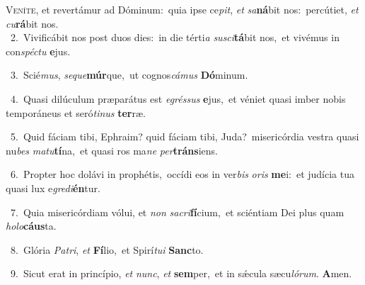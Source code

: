 \lettrine{\initial\textcolor{\initialcolor}{V}}{eníte,} et revertámur ad Dóminum:~\dagger quia ipse ce\-\textit{pit}\-, \textit{et} \textit{sa}\-\textbf{ná}bit nos:~\star percútiet, \textit{et} \textit{cu}\-\textbf{rá}bit nos.\\
{\numbfont\textcolor{\numbcolor}{~2.}}~Vivificábit nos post duos dies:~\dagger in die térti\textit{a} \textit{su}\-\textit{sci}\textbf{tá}bit nos,~\star et vivémus in con\-\textit{spéc}\-\textit{tu} \textbf{e}\-jus.\par
{\numbfont\textcolor{\numbcolor}{~3.}}~Scié\-\textit{mus}\-, \textit{se}\-\textit{que}\textbf{múr}que,~\star ut cognos\-\textit{cá}\-\textit{mus} \textbf{Dó}\-minum.\par
{\numbfont\textcolor{\numbcolor}{~4.}}~Quasi dilúculum præparátus est \textit{e}\-\textit{grés}\textit{sus} \textbf{e}\-jus,~\star et véniet quasi imber nobis temporáneus et seró\-\textit{ti}\-\textit{nus} \textbf{ter}\-ræ.\par
{\numbfont\textcolor{\numbcolor}{~5.}}~Quid fáciam tibi, Ephraim? quid fáciam tibi, Juda?~\dagger misericórdia vestra quasi nu\textit{bes} \textit{ma}\-\textit{tu}\textbf{tí}na,~\star et quasi ros ma\textit{ne} \textit{per}\-\textbf{tráns}iens.\par
{\numbfont\textcolor{\numbcolor}{~6.}}~Propter hoc dolávi in prophétis,~\dagger occídi eos in ver\textit{bis} \textit{o}\-\textit{ris} \textbf{me}\-i:~\star et judícia tua quasi lux e\-\textit{gre}\-\textit{di}\textbf{én}tur.\par
{\numbfont\textcolor{\numbcolor}{~7.}}~Quia misericórdiam vólui, et \textit{non} \textit{sa}\-\textit{cri}\textbf{fí}cium,~\star et sciéntiam Dei plus quam \textit{ho}\-\textit{lo}\textbf{cáus}ta.\par
{\numbfont\textcolor{\numbcolor}{~8.}}~Glória \textit{Pa}\-\textit{tri}, \textit{et} \textbf{Fí}\-lio,~\star et Spirí\-\textit{tu}\-\textit{i} \textbf{Sanc}\-to.\par
{\numbfont\textcolor{\numbcolor}{~9.}}~Sicut erat in princípio, \textit{et} \textit{nunc}\-, \textit{et} \textbf{sem}\-per,~\star et in sǽcula sæcu\-\textit{ló}\-\textit{rum}. \textbf{A}\-men.\par
